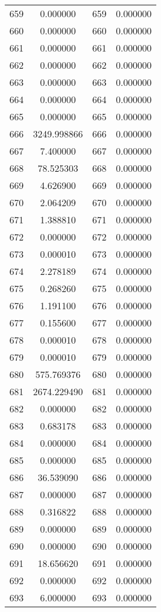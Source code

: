 \documentclass[12pt]{article}
\begin{document}
\begin{longtable}{@{}cccc@{}}
659 & 0.000000 & 659 & 0.000000 \\
660 & 0.000000 & 660 & 0.000000 \\
661 & 0.000000 & 661 & 0.000000 \\
662 & 0.000000 & 662 & 0.000000 \\
663 & 0.000000 & 663 & 0.000000 \\
664 & 0.000000 & 664 & 0.000000 \\
665 & 0.000000 & 665 & 0.000000 \\
666 & 3249.998866 & 666 & 0.000000 \\
667 & 7.400000 & 667 & 0.000000 \\
668 & 78.525303 & 668 & 0.000000 \\
669 & 4.626900 & 669 & 0.000000 \\
670 & 2.064209 & 670 & 0.000000 \\
671 & 1.388810 & 671 & 0.000000 \\
672 & 0.000000 & 672 & 0.000000 \\
673 & 0.000010 & 673 & 0.000000 \\
674 & 2.278189 & 674 & 0.000000 \\
675 & 0.268260 & 675 & 0.000000 \\
676 & 1.191100 & 676 & 0.000000 \\
677 & 0.155600 & 677 & 0.000000 \\
678 & 0.000010 & 678 & 0.000000 \\
679 & 0.000010 & 679 & 0.000000 \\
680 & 575.769376 & 680 & 0.000000 \\
681 & 2674.229490 & 681 & 0.000000 \\
682 & 0.000000 & 682 & 0.000000 \\
683 & 0.683178 & 683 & 0.000000 \\
684 & 0.000000 & 684 & 0.000000 \\
685 & 0.000000 & 685 & 0.000000 \\
686 & 36.539090 & 686 & 0.000000 \\
687 & 0.000000 & 687 & 0.000000 \\
688 & 0.316822 & 688 & 0.000000 \\
689 & 0.000000 & 689 & 0.000000 \\
690 & 0.000000 & 690 & 0.000000 \\
691 & 18.656620 & 691 & 0.000000 \\
692 & 0.000000 & 692 & 0.000000 \\
693 & 6.000000 & 693 & 0.000000 \\

\end{longtable}
\end{document}
